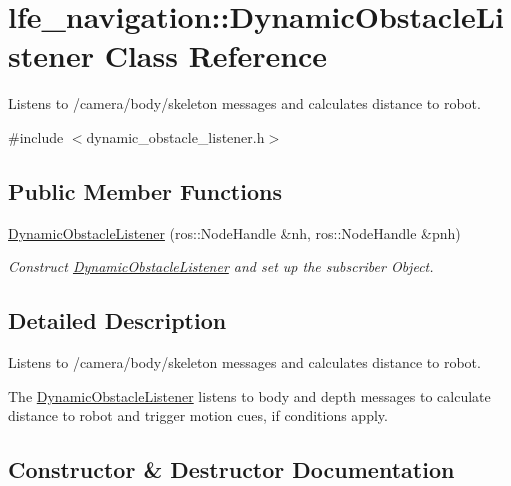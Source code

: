 \hypertarget{classlfe__navigation_1_1DynamicObstacleListener}{}\section{lfe\+\_\+navigation\+:\+:Dynamic\+Obstacle\+Listener Class Reference}
\label{classlfe__navigation_1_1DynamicObstacleListener}


Listens to /camera/body/skeleton messages and calculates distance to robot.  




{\ttfamily \#include $<$dynamic\+\_\+obstacle\+\_\+listener.\+h$>$}

\subsection*{Public Member Functions}
\begin{DoxyCompactItemize}
\item 
\hyperlink{classlfe__navigation_1_1DynamicObstacleListener_a89fd3ff1c78c99293de8297e67abdea9}{Dynamic\+Obstacle\+Listener} (ros\+::\+Node\+Handle \&nh, ros\+::\+Node\+Handle \&pnh)
\begin{DoxyCompactList}\small\item\em Construct \hyperlink{classlfe__navigation_1_1DynamicObstacleListener}{Dynamic\+Obstacle\+Listener} and set up the subscriber Object. \end{DoxyCompactList}\end{DoxyCompactItemize}


\subsection{Detailed Description}
Listens to /camera/body/skeleton messages and calculates distance to robot. 

The \hyperlink{classlfe__navigation_1_1DynamicObstacleListener}{Dynamic\+Obstacle\+Listener} listens to body and depth messages to calculate distance to robot and trigger motion cues, if conditions apply. 

\subsection{Constructor \& Destructor Documentation}
